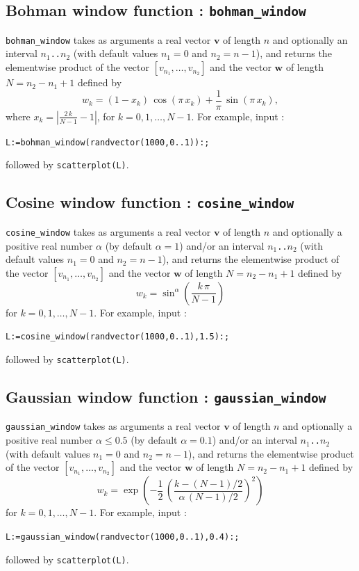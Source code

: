 \documentclass[a4paper,11pt]{book}
\begin{document}
\subsection{Bohman window function : {\tt bohman\_window}}
{\tt bohman\_window} takes as arguments a real vector $ \mathbf{v} $ of length $ n $ and optionally an interval $ n_1 ${\tt ..}$ n_2 $ (with default values $ n_1=0 $ and $ n_2=n-1 $), and returns the elementwise product of the vector $ [v_{n_1},\dots,v_{n_2}] $ and the vector $ \mathbf{w} $ of length $ N=n_2-n_1+1 $ defined by
\[ w_k=\left(1-x_k\right)\,\cos\left(\pi\,x_k\right)+\frac{1}{\pi}\,\sin\left(\pi\,x_k\right), \]
where $ x_k=\left|\frac{2\,k}{N-1}-1\right| $, for $ k=0,1,\dots,N-1 $. For example, input :
\begin{center}
	{\tt L:=bohman\_window(randvector(1000,0..1)):;}
\end{center}
followed by {\tt scatterplot(L)}.

\subsection{Cosine window function : {\tt cosine\_window}}
{\tt cosine\_window} takes as arguments a real vector $ \mathbf{v} $ of length $ n $ and optionally a positive real number $ \alpha $ (by default $ \alpha=1 $) and/or an interval $ n_1 ${\tt ..}$ n_2 $ (with default values $ n_1=0 $ and $ n_2=n-1 $), and returns the elementwise product of the vector $ [v_{n_1},\dots,v_{n_2}] $ and the vector $ \mathbf{w} $ of length $ N=n_2-n_1+1 $ defined by
\[ w_k=\sin^\alpha\left(\frac{k\,\pi}{N-1}\right) \]
for $ k=0,1,\dots,N-1 $. For example, input :
\begin{center}
	{\tt L:=cosine\_window(randvector(1000,0..1),1.5):;}
\end{center}
followed by {\tt scatterplot(L)}.

\subsection{Gaussian window function : {\tt gaussian\_window}}
{\tt gaussian\_window} takes as arguments a real vector $ \mathbf{v} $ of length $ n $ and optionally a positive real number $ \alpha\leq 0.5 $ (by default $ \alpha=0.1 $) and/or an interval $ n_1 ${\tt ..}$ n_2 $ (with default values $ n_1=0 $ and $ n_2=n-1 $), and returns the elementwise product of the vector $ [v_{n_1},\dots,v_{n_2}] $ and the vector $ \mathbf{w} $ of length $ N=n_2-n_1+1 $ defined by
\[ w_k=\exp\left(-\frac{1}{2}\,\left(\frac{k-(N-1)/2}{\alpha\,(N-1)/2}\right)^2\right) \]
for $ k=0,1,\dots,N-1 $. For example, input :
\begin{center}
	{\tt L:=gaussian\_window(randvector(1000,0..1),0.4):;}
\end{center}
followed by {\tt scatterplot(L)}.
\end{document}
